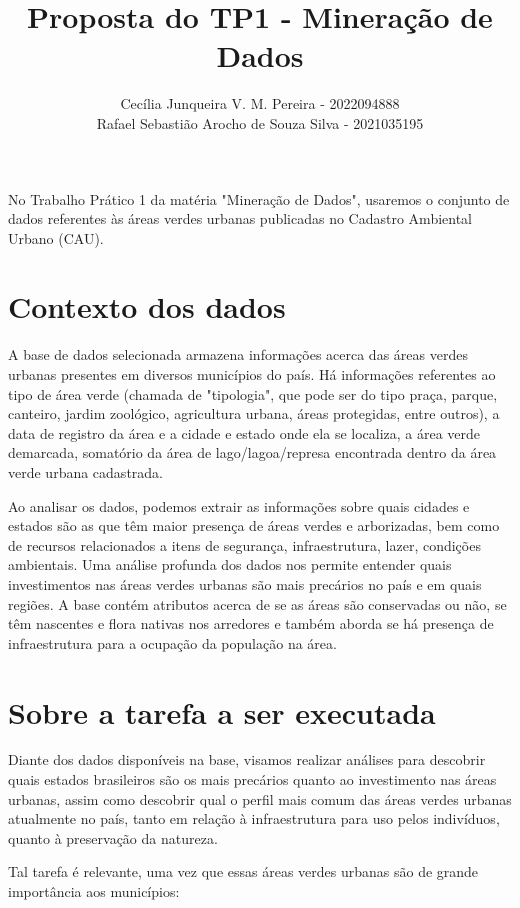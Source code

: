 \documentclass[12pt]{article}
\title{Proposta do TP1 - Mineração de Dados}
\author{Cecília Junqueira V. M. Pereira - 2022094888 \\ 
        Rafael Sebastião Arocho de Souza Silva - 2021035195}
\begin{document}
 

\maketitle
     
\begin{resumo} 
    No Trabalho Prático 1 da matéria "Mineração de Dados", usaremos o conjunto de dados referentes às áreas verdes urbanas publicadas no Cadastro Ambiental Urbano (CAU).
\end{resumo}

\section{Contexto dos dados}
    A base de dados selecionada armazena informações acerca das áreas verdes urbanas presentes em diversos municípios do país. Há informações referentes ao tipo de área verde (chamada de "tipologia", que pode ser do tipo praça, parque, canteiro, jardim zoológico, agricultura urbana, áreas protegidas, entre outros), a data de registro da área e a cidade e estado onde ela se localiza, a área verde demarcada, somatório da área de lago/lagoa/represa encontrada dentro da área verde urbana cadastrada.

    Ao analisar os dados, podemos extrair as informações sobre quais cidades e estados são as que têm maior presença de áreas verdes e arborizadas, bem como de recursos relacionados a itens de segurança, infraestrutura, lazer, condições ambientais. Uma análise profunda dos dados nos permite entender quais investimentos nas áreas verdes urbanas são mais precários no país e em quais regiões. A base contém atributos acerca de se as áreas são conservadas ou não, se têm nascentes e flora nativas nos arredores e também aborda se há presença de infraestrutura para a ocupação da população na área.

\section{Sobre a tarefa a ser executada}
    Diante dos dados disponíveis na base, visamos realizar análises para descobrir quais estados brasileiros são os mais precários quanto ao investimento nas áreas urbanas, assim como descobrir qual o perfil mais comum das áreas verdes urbanas atualmente no país, tanto em relação à infraestrutura para uso pelos indivíduos, quanto à preservação da natureza.

    Tal tarefa é relevante, uma vez que essas áreas verdes urbanas são de grande importância aos municípios:
    
\end{document}
